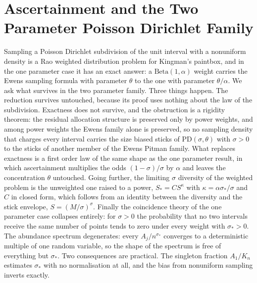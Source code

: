 \DeclareRobustCommand{\ESF}{\mathrm{ESF}}
\DeclareRobustCommand{\PD}{\mathrm{PD}}
\DeclareRobustCommand{\GEM}{\mathrm{GEM}}
\DeclareRobustCommand{\Ex}{\mathbb{E}}
\DeclareRobustCommand{\Pr}{\mathbb{P}}
\DeclareRobustCommand{\Beta}{\mathrm{Beta}}
\DeclareRobustCommand{\Var}{\mathrm{Var}}
\chapter{Ascertainment and the Two Parameter Poisson Dirichlet Family}\label{ch:py}
\begin{chaptersummary}
Sampling a Poisson Dirichlet subdivision of the unit interval with a nonuniform density is a Rao
weighted distribution problem for Kingman's paintbox, and in the one parameter case it has an exact
answer: a $\Beta(1,\alpha)$ weight carries the Ewens sampling formula with parameter $\theta$ to the
one with parameter $\theta/\alpha$. We ask what survives in the two parameter family. Three things
happen. The reduction survives untouched, because its proof uses nothing about the law of the
subdivision. Exactness does not survive, and the obstruction is a rigidity theorem: the residual
allocation structure is preserved only by power weights, and among power weights the Ewens family
alone is preserved, so no sampling density that charges every interval carries the size biased sticks of $\PD(\sigma,\theta)$ with $\sigma>0$ to
the sticks of another member of the Ewens Pitman family. What replaces exactness is a first order law of the same
shape as the one parameter result, in which ascertainment multiplies the odds $(1-\sigma)/\sigma$ by
$\alpha$ and leaves the concentration $\theta$ untouched. Going further, the limiting
$\sigma$ diversity of the weighted problem is the unweighted one raised to a power, $S_* = CS^{\kappa}$
with $\kappa = \alpha\sigma_*/\sigma$ and $C$ in closed form, which follows from an identity between
the diversity and the stick envelope, $S = (M/\sigma)^{\sigma}$. Finally the coincidence theory of the
one parameter case collapses entirely: for $\sigma > 0$ the probability that no two intervals receive
the same number of points tends to zero under every weight with $\sigma_* > 0$. The abundance spectrum degenerates: every $A_j/n^{\sigma_*}$ converges to a deterministic multiple
of one random variable, so the shape of the spectrum is free of everything but $\sigma_*$. Two
consequences are practical. The singleton fraction $A_1/K_n$ estimates $\sigma_*$ with no
normalisation at all, and the bias from nonuniform sampling inverts exactly.
\end{chaptersummary}

